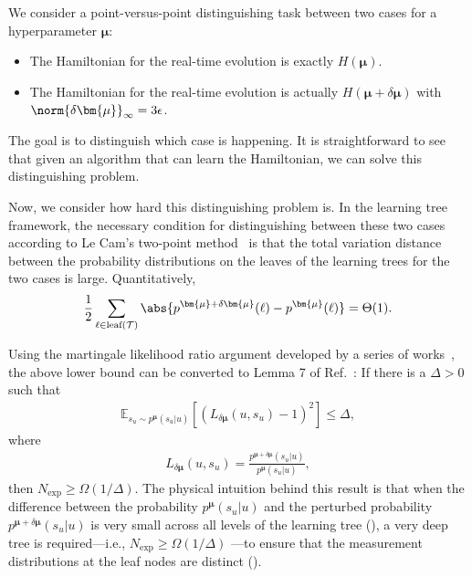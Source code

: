 \documentclass[twocolumn,superscriptaddress,aps,showpacs,amsmath,amstex,amssymb,citeautoscript,floatfix,pra,preprintnumbers]{revtex4-2}
\newcounter{alg}
\theoremstyle{plain}
\theoremstyle{plain}
\theoremstyle{plain}
\theoremstyle{plain}
\theoremstyle{plain}
\theoremstyle{plain}
\newcommand{\eqs}[1]{\begin{equation}\begin{split}#1\end{split}\end{equation}}
\begin{document}
\begin{appendix}
We consider a point-versus-point distinguishing task between two cases for a hyperparameter $\bm{\mu}$:
\begin{itemize}
    \item The Hamiltonian for the real-time evolution is exactly $H(\bm{\mu})$.
    \item The Hamiltonian for the real-time evolution is actually $H(\bm{\mu}+\delta\bm{\mu})$ with $\norm{\delta\bm{\mu}}_\infty=3\epsilon$.
\end{itemize}
The goal is to distinguish which case is happening. 
It is straightforward to see that given an algorithm that can learn the Hamiltonian, we can solve this distinguishing problem. 

Now, we consider how hard this distinguishing problem is. 
In the learning tree framework, the necessary condition for distinguishing between these two cases according to Le Cam's two-point method~\cite{yu1997assouad} is that the total variation distance between the probability distributions on the leaves of the learning trees for the two cases is large. 
Quantitatively,
\eqs{
\frac{1}{2}\sum_{\ell\in\text{leaf}(\mathcal{T})}\abs{p^{\bm{\mu}+\delta\bm{\mu}}(\ell)-p^{\bm{\mu}}(\ell)}=\Theta(1). \label{app_eq:leaf_prob_diff}
}



Using the martingale likelihood ratio argument developed by a series of works~\cite{ComplexityNISQ,2023arXiv230914326C,2021arXiv211207646C}, the above lower bound can be converted to Lemma 7 of Ref.~\cite{OptimalTradeOff}: If there is a $\Delta>0$ such that 
\begin{align}\label{eq:martingale}
\mathbb{E}_{s_u\sim p^{\bm{\mu}}(s_u|u)}[(L_{\delta\bm{\mu}}(u,s_u)-1)^2]\leq\Delta,
\end{align}
where
\begin{align}
L_{\delta\bm{\mu}}(u,s_u)=\frac{p^{\bm{\mu}+\delta\bm{\mu}}(s_u|u)}{p^{\bm{\mu}}(s_u|u)},
\end{align}
then $N_{\exp}\geq\Omega(1/\Delta)$. The physical intuition behind this result is that when the difference between the probability  $p^{\bm{\mu}}(s_u|u)$  and the perturbed probability  $p^{\bm{\mu}+\delta \bm{\mu}}(s_u|u)$  is very small across all levels of the learning tree (), a very deep tree is required—i.e.,  $N_{\exp} \geq \Omega(1/\Delta)$ —to ensure that the measurement distributions at the leaf nodes are distinct ().


\end{appendix}
\end{document}
